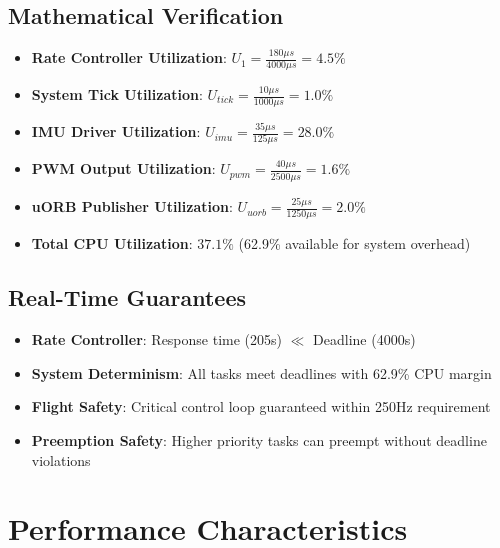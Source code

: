 \documentclass[landscape,a4paper]{article}
\begin{document}
\begin{tcolorbox}[colback=px4green!5,colframe=px4green,width=\textwidth,arc=2mm,boxrule=1.5pt,title=\textbf{CPU Utilization Analysis}]

\subsection{Mathematical Verification}
\begin{itemize}
    \item \textbf{Rate Controller Utilization}: $U_1 = \frac{180\mu s}{4000\mu s} = 4.5\%$
    \item \textbf{System Tick Utilization}: $U_{tick} = \frac{10\mu s}{1000\mu s} = 1.0\%$
    \item \textbf{IMU Driver Utilization}: $U_{imu} = \frac{35\mu s}{125\mu s} = 28.0\%$
    \item \textbf{PWM Output Utilization}: $U_{pwm} = \frac{40\mu s}{2500\mu s} = 1.6\%$
    \item \textbf{uORB Publisher Utilization}: $U_{uorb} = \frac{25\mu s}{1250\mu s} = 2.0\%$
    \item \textbf{Total CPU Utilization}: $37.1\%$ (62.9\% available for system overhead)
\end{itemize}

\subsection{Real-Time Guarantees}
\begin{itemize}
    \item \textbf{Rate Controller}: Response time (205\textmu s) $\ll$ Deadline (4000\textmu s) \checkmark
    \item \textbf{System Determinism}: All tasks meet deadlines with 62.9\% CPU margin \checkmark
    \item \textbf{Flight Safety}: Critical control loop guaranteed within 250Hz requirement \checkmark
    \item \textbf{Preemption Safety}: Higher priority tasks can preempt without deadline violations \checkmark
\end{itemize}
\end{tcolorbox}

\section{Performance Characteristics}
\end{document}

